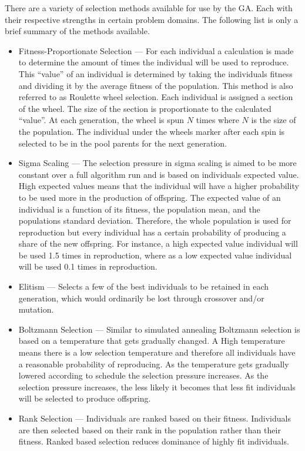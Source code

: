 There are a variety of selection methods available for use by the \gls{GA}. Each with their respective strengths in certain problem domains. The following list is only a brief summary of the methods available.
\begin{itemize}
    \item{Fitness-Proportionate Selection} --- For each individual a calculation is made to determine the amount of times the individual will be used to reproduce. This ``value'' of an individual is determined by taking the individuals fitness and dividing it by the average fitness of the population. This method is also referred to as Roulette wheel selection. Each individual is assigned a section of the wheel. The size of the section is proportionate to the calculated ``value''. At each generation, the wheel is spun $N$ times where $N$ is the size of the population. The individual under the wheels marker after each spin is selected to be in the pool parents for the next generation\cite{IntroToGAs}.
    \item{Sigma Scaling} --- The selection pressure in sigma scaling is aimed to be more constant over a full algorithm run and is based on individuals expected value. High expected values means that the individual will have a higher probability to be used more in the production of offspring. The expected value of an individual is a function of its fitness, the population mean, and the populations standard deviation\cite{IntroToGAs}. Therefore, the whole population is used for reproduction but every individual has a certain probability of producing a share of the new offspring. For instance, a high expected value individual will be used 1.5 times in reproduction, where as a low expected value individual will be used 0.1 times in reproduction\cite{IntroToGAs}.
    \item{Elitism} --- Selects a few of the best individuals to be retained in each generation, which would ordinarily be lost through crossover and/or mutation.
    \item{Boltzmann Selection} --- Similar to simulated annealing Boltzmann selection is based on a temperature that gets gradually changed. A High temperature means there is a low selection temperature and therefore all individuals have a reasonable probability of reproducing. As the temperature gets gradually lowered according to schedule the selection pressure increases. As the selection pressure increases, the less likely it becomes that less fit individuals will be selected to produce offspring\cite{IntroToGAs}.
    \item{Rank Selection} --- Individuals are ranked based on their fitness. Individuals are then selected based on their rank in the population rather than their fitness.  Ranked based selection reduces dominance of highly fit individuals\cite{IntroToGAs}.

\end{itemize}

